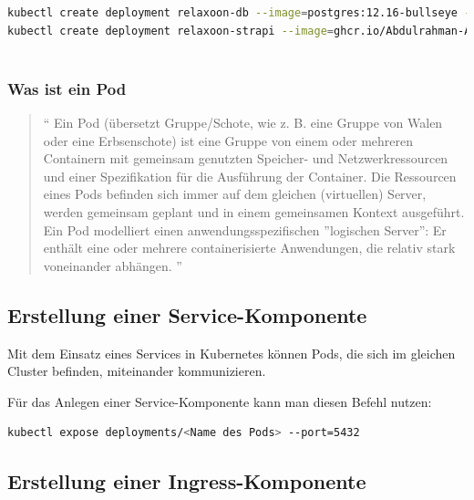 \begin{lstlisting}[language=bash, caption=create k8s deployments]
kubectl create deployment relaxoon-db --image=postgres:12.16-bullseye --port=5432
kubectl create deployment relaxoon-strapi --image=ghcr.io/Abdulrahman-AL-Sabagh/relaxoon-strapi:latest --port=8080
    
\end{lstlisting}


\subsubsection{Was ist ein Pod}

\begin{quotation}
  ``
  Ein Pod (übersetzt Gruppe/Schote, wie z. B. eine Gruppe von Walen oder eine Erbsenschote)
  ist eine Gruppe von einem oder mehreren Containern mit gemeinsam genutzten Speicher- und
  Netzwerkressourcen und einer Spezifikation für die Ausführung der Container.
  Die Ressourcen eines Pods befinden sich immer auf dem gleichen (virtuellen) Server,
  werden gemeinsam geplant und in einem gemeinsamen Kontext ausgeführt.
  Ein Pod modelliert einen anwendungsspezifischen ''logischen Server'': Er enthält eine oder mehrere
  containerisierte Anwendungen, die relativ stark voneinander abhängen.
  ''
  \cite{pod}
\end{quotation}






\subsection{Erstellung einer Service-Komponente}

Mit dem Einsatz eines Services in Kubernetes können Pods,
die sich im gleichen Cluster befinden, miteinander kommunizieren. \cite{k8s-service}

Für das Anlegen einer Service-Komponente kann man diesen Befehl nutzen:

\begin{lstlisting}[language=bash,caption=create a service component]
kubectl expose deployments/<Name des Pods> --port=5432
\end{lstlisting}






\subsection{Erstellung einer Ingress-Komponente}

